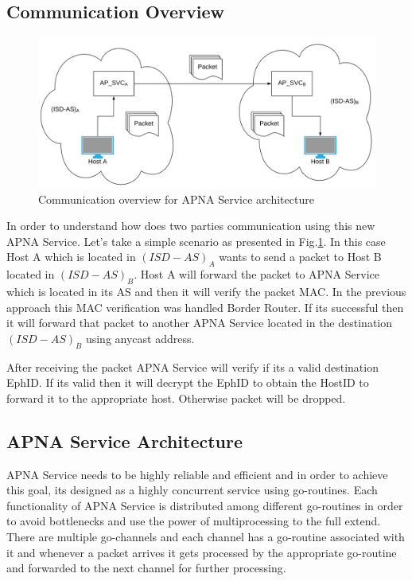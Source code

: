 \subsection{Communication Overview}
\begin{figure}[th!!]
\centering
\hspace*{-2cm}\includegraphics[scale=0.3]{Figures/svc_arch.png}
\decoRule
\caption[Communication overview for APNA Service]{Communication overview for APNA Service architecture}
\label{fig:srv_comm}
\end{figure}
In order to understand how does two parties communication using this new APNA Service. Let's take a simple scenario as presented in Fig.\ref{fig:srv_comm}. In this case Host A which is located in $(ISD-AS)_{A}$ wants to send a packet to Host B located in $(ISD-AS)_{B}$. Host A will forward the packet to APNA Service which is located in its AS and then it will verify the packet MAC. In the previous approach this MAC verification was handled Border Router. If its successful then it will forward that packet to another APNA Service located in the destination $(ISD-AS)_{B}$ using anycast address.

After receiving the packet APNA Service will verify if its a valid destination EphID. If its valid then it will decrypt the EphID to obtain the HostID to forward it to the appropriate host. Otherwise packet will be dropped.

\subsection{APNA Service Architecture}
APNA Service needs to be highly reliable and efficient and in order to achieve this goal, its designed as a highly concurrent service using go-routines. Each functionality of APNA Service is distributed among different go-routines in order to avoid bottlenecks and use the power of multiprocessing to the full extend. There are multiple go-channels and each channel has a go-routine associated with it and whenever a packet arrives it gets processed by the appropriate go-routine and forwarded to the next channel for further processing.

